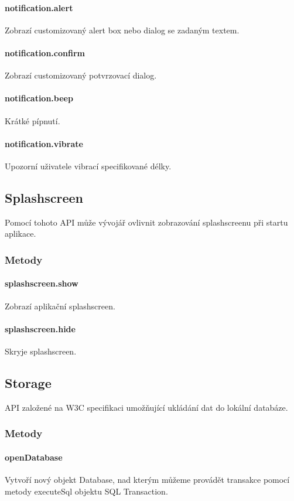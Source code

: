 \paragraph{notification.alert}
Zobrazí customizovaný alert box nebo dialog se zadaným textem.

\paragraph{notification.confirm}
Zobrazí customizovaný potvrzovací dialog.

\paragraph{notification.beep}
Krátké pípnutí.

\paragraph{notification.vibrate}
Upozorní uživatele vibrací specifikované délky.

\subsection{Splashscreen}
Pomocí tohoto API může vývojář ovlivnit zobrazování splashscreenu při startu aplikace.

\subsubsection{Metody}
\paragraph{splashscreen.show}
Zobrazí aplikační splashscreen.

\paragraph{splashscreen.hide}
Skryje splashscreen.

\subsection{Storage}
API založené na W3C specifikaci umožňující ukládání dat do lokální databáze.

\subsubsection{Metody}
\paragraph{openDatabase}
Vytvoří nový objekt Database, nad kterým můžeme provádět transakce pomocí metody executeSql objektu SQL Transaction.

